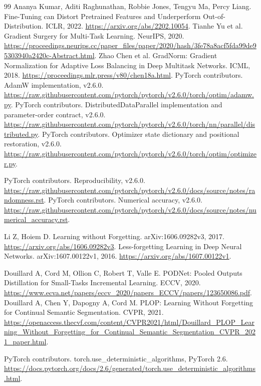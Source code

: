 \documentclass[UTF8,fontset=fandol,zihao=5,a4paper]{ctexart}
\begin{document}
\begin{thebibliography}{99}
 Ananya Kumar, Aditi Raghunathan, Robbie Jones, Tengyu Ma, Percy Liang.
Fine-Tuning can Distort Pretrained Features and Underperform Out-of-Distribution. ICLR, 2022.
\url{https://arxiv.org/abs/2202.10054}.
 Tianhe Yu et al. Gradient Surgery for Multi-Task Learning. NeurIPS, 2020.
\url{https://proceedings.neurips.cc/paper_files/paper/2020/hash/3fe78a8acf5fda99de95303940a2420c-Abstract.html}.
 Zhao Chen et al. GradNorm: Gradient Normalization for Adaptive Loss Balancing in Deep Multitask Networks. ICML, 2018.
\url{https://proceedings.mlr.press/v80/chen18a.html}.
 PyTorch contributors. AdamW implementation, v2.6.0.
\url{https://raw.githubusercontent.com/pytorch/pytorch/v2.6.0/torch/optim/adamw.py}.
 PyTorch contributors. DistributedDataParallel implementation and parameter-order contract, v2.6.0.
\url{https://raw.githubusercontent.com/pytorch/pytorch/v2.6.0/torch/nn/parallel/distributed.py}.
 PyTorch contributors. Optimizer state dictionary and positional restoration, v2.6.0.
\url{https://raw.githubusercontent.com/pytorch/pytorch/v2.6.0/torch/optim/optimizer.py}.

 PyTorch contributors. Reproducibility, v2.6.0.
\url{https://raw.githubusercontent.com/pytorch/pytorch/v2.6.0/docs/source/notes/randomness.rst}.
 PyTorch contributors. Numerical accuracy, v2.6.0.
\url{https://raw.githubusercontent.com/pytorch/pytorch/v2.6.0/docs/source/notes/numerical_accuracy.rst}.

 Li Z, Hoiem D. Learning without Forgetting. arXiv:1606.09282v3, 2017.
\url{https://arxiv.org/abs/1606.09282v3}.
 Less-forgetting Learning in Deep Neural Networks. arXiv:1607.00122v1, 2016.
\url{https://arxiv.org/abs/1607.00122v1}.

 Douillard A, Cord M, Ollion C, Robert T, Valle E. PODNet: Pooled Outputs Distillation for Small-Tasks Incremental Learning. ECCV, 2020.
\url{https://www.ecva.net/papers/eccv_2020/papers_ECCV/papers/123650086.pdf}.
 Douillard A, Chen Y, Dapogny A, Cord M. PLOP: Learning Without Forgetting for Continual Semantic Segmentation. CVPR, 2021.
\url{https://openaccess.thecvf.com/content/CVPR2021/html/Douillard_PLOP_Learning_Without_Forgetting_for_Continual_Semantic_Segmentation_CVPR_2021_paper.html}.

 PyTorch contributors. torch.use\_deterministic\_algorithms, PyTorch 2.6. \url{https://docs.pytorch.org/docs/2.6/generated/torch.use_deterministic_algorithms.html}.
\end{thebibliography}
\end{document}
